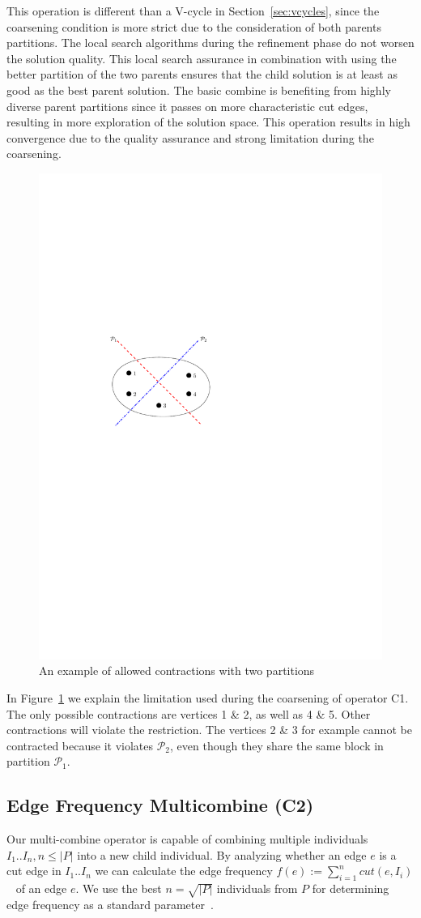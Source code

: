 \documentclass[a4paper,12pt,titlepage, BCOR7mm,headsepline]{scrbook}
\numberwithin{equation}{section}
\begin{document}
This operation is different than a V-cycle in Section~\ref{sec:vcycles}, since the coarsening condition is more strict due to the consideration of both parents partitions. The local search algorithms during the refinement phase do not worsen the solution quality.
This local search assurance in combination with using the better partition of the two parents ensures that the child solution is at least as good as the best parent solution. \label{qualityassurance} The basic combine is benefiting from highly diverse parent partitions since it passes on more characteristic cut edges, resulting in more exploration of the solution space. This operation results in high convergence due to the quality assurance and strong limitation during the coarsening. 

\begin{figure}[H] 

  \begin{center}
   \includegraphics[width=.5\textwidth]{Ipe/parent_combine.pdf}
  \caption{An example of allowed contractions with two partitions}
  \label{fig:parent_combine}
  \end{center}

\end{figure}
In Figure~\ref{fig:parent_combine} we explain the limitation used during the coarsening of operator C1. The only possible contractions are vertices 1 \& 2, as well as 4 \& 5. Other contractions will violate the restriction. The vertices 2 \& 3 for example cannot be contracted because it violates $\mathcal{P}_2$, even though they share the same block in partition $\mathcal{P}_1$. 
\subsection{Edge Frequency Multicombine (C2)}
\label{sec:edgefrequency}
Our multi-combine operator is capable of combining multiple individuals $I_1.. I_n, n \le |P|$ into a new child individual. By analyzing whether an edge $e$ is a cut edge in $I_1 ..I_n$ we can calculate the edge frequency $f(e) := \sum_{i=1}^n cut(e,I_i)$~\cite{wichlund1998multilevel} of an edge $e$. We use the best $n = \sqrt{|P|}$ individuals from $P$ for determining edge frequency as a standard parameter~\cite{delling2011graph}. 
\end{document}
